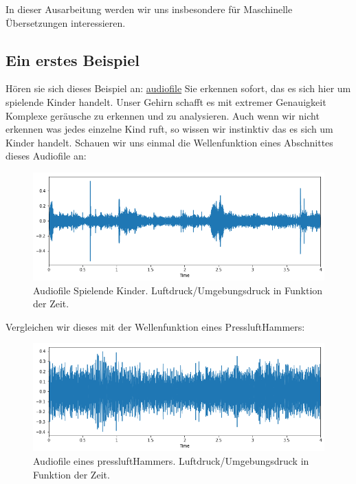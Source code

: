 \documentclass{thesisclass}
\begin{document}
In dieser Ausarbeitung werden wir uns insbesondere für Maschinelle Übersetzungen interessieren.

\subsection{Ein erstes Beispiel}
	Hören sie sich dieses Beispiel an: \hyperlink{https://www.audioblocks.com/stock-audio/playground-children-playing.html}{audiofile}\newline
	Sie erkennen sofort, das es sich hier um spielende Kinder handelt.
Unser Gehirn schafft es mit extremer Genauigkeit Komplexe geräusche zu erkennen und zu analysieren. Auch wenn wir nicht erkennen was jedes einzelne Kind ruft, so wissen wir instinktiv das es sich um Kinder handelt.
Schauen wir uns einmal die Wellenfunktion eines Abschnittes dieses Audiofile an:
\begin{figure}[h!]
\includegraphics[width=\textwidth]{images/KidsPlaying.png}
  \caption{Audiofile Spielende Kinder. Luftdruck/Umgebungsdruck in Funktion der Zeit. \cite{kidsPlaying}}
  \label{fig:Audiofile Spielende Kinder}
\end{figure}

Vergleichen wir dieses mit der Wellenfunktion eines PressluftHammers:
\begin{figure}[h!]
\includegraphics[width=\textwidth]{images/jackhammer.png}
  \caption{Audiofile eines pressluftHammers. Luftdruck/Umgebungsdruck in Funktion der Zeit. \cite{pressluftHammer}}
  \label{fig:Audiofile pressluftHammer}
\end{figure}
\end{document}

